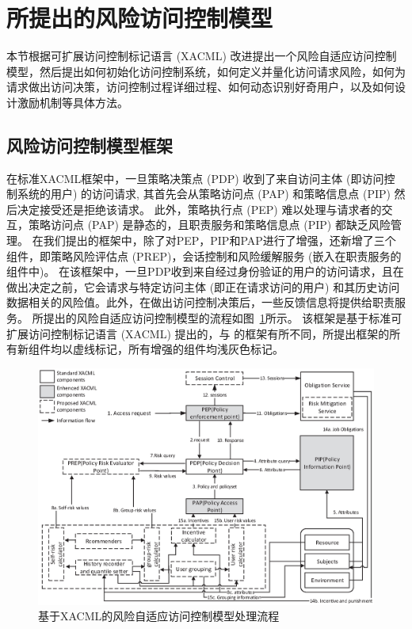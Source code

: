 \section{所提出的风险访问控制模型}
\label{sec:proposed model}
本节根据可扩展访问控制标记语言 (XACML) \cite{verma2004xml} 改进提出一个风险自适应访问控制模型，然后提出如何初始化访问控制系统，如何定义并量化访问请求风险，如何为请求做出访问决策，访问控制过程详细过程、如何动态识别好奇用户，以及如何设计激励机制等具体方法。

\subsection{风险访问控制模型框架}
\label{subsec:framework}

在标准XACML框架中，一旦策略决策点 (PDP) 收到了来自访问主体 (即访问控制系统的用户) 的访问请求, 其首先会从策略访问点 (PAP) 和策略信息点 (PIP) 然后决定接受还是拒绝该请求。 此外，策略执行点 (PEP) 难以处理与请求者的交互，策略访问点 (PAP) 是静态的，且职责服务和策略信息点 (PIP) 都缺乏风险管理。
在我们提出的框架中，除了对PEP，PIP和PAP进行了增强，还新增了三个组件，即策略风险评估点 (PREP)，会话控制和风险缓解服务 (嵌入在职责服务的组件中)。 在该框架中，一旦PDP收到来自经过身份验证的用户的访问请求，且在做出决定之前，它会请求与特定访问主体 (即正在请求访问的用户) 和其历史访问数据相关的风险值。此外，在做出访问控制决策后，一些反馈信息将提供给职责服务。 所提出的风险自适应访问控制模型的流程如图~\ref{fig:Process_flow}所示。 该框架是基于标准可扩展访问控制标记语言 (XACML) 提出的，与 \cite{shaikh2012dynamic}的框架有所不同，所提出框架的所有新组件均以虚线标记，所有增强的组件均浅灰色标记。


\begin{figure}[htbp]
	\includegraphics[width=\linewidth]{./figures/Process_flow.eps}
	\caption{基于XACML的风险自适应访问控制模型处理流程}
	\label{fig:Process_flow}
\end{figure}

